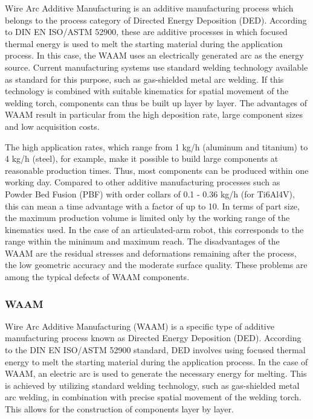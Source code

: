 Wire Arc Additive Manufacturing is an additive manufacturing process which belongs to the process category of Directed Energy Deposition (DED). According to DIN EN ISO/ASTM 52900, these are additive processes in which focused thermal energy is used to melt the starting material during the application process. In this case, the WAAM uses an electrically generated arc as the energy source. Current manufacturing systems use standard welding technology available as standard for this purpose, such as gas-shielded metal arc welding. If this technology is combined with suitable kinematics for spatial movement of the welding torch, components can thus be built up layer by layer. The advantages of WAAM result in particular from the high deposition rate, large component sizes and low acquisition costs.

The high application rates, which range from 1 kg/h (aluminum and titanium) to 4 kg/h (steel), for example, make it possible to build large components at reasonable production times. Thus, most components can be produced within one working day. Compared to other additive manufacturing processes such as Powder Bed Fusion (PBF) with order collars of 0.1 - 0.36 kg/h (for Ti6Al4V), this can mean a time advantage with a factor of up to 10. In terms of part size, the maximum production volume is limited only by the working range of the kinematics used. In the case of an articulated-arm robot, this corresponds to the range within the minimum and maximum reach. The disadvantages of the WAAM are the residual stresses and deformations remaining after the process, the low geometric accuracy and the moderate surface quality. These problems are among the typical defects of WAAM components.


\subsubsection{WAAM}
Wire Arc Additive Manufacturing (WAAM) is a specific type of additive manufacturing process known as Directed Energy Deposition (DED). According to the DIN EN ISO/ASTM 52900 standard, DED involves using focused thermal energy to melt the starting material during the application process. In the case of WAAM, an electric arc is used to generate the necessary energy for melting. This is achieved by utilizing standard welding technology, such as gas-shielded metal arc welding, in combination with precise spatial movement of the welding torch. This allows for the construction of components layer by layer.

